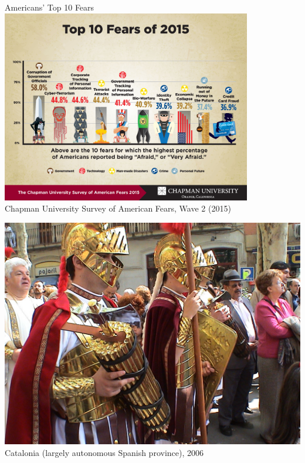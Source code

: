 \begin{frame}{Americans' Top 10 Fears}
    \centering
    \includegraphics[width=0.82\textwidth]{img/Top10Fears.jpg} \\
    Chapman University Survey of American Fears, Wave 2 (2015) \\
\end{frame}


\begin{frame}
    \centering
    \includegraphics[width=.9\textwidth]{img/fasces/fake-fasces.jpg} \\
    Catalonia (largely autonomous Spanish province), 2006 \\
\end{frame}

